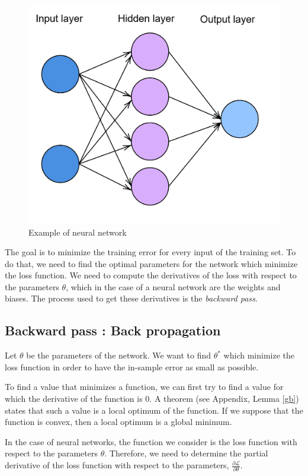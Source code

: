 \documentclass[10pt,a4paper]{article}
\theoremstyle{definition}
\theoremstyle{plain}
\begin{document}
\begin{figure}
\center
\includegraphics[scale=0.2]{nn.png}
\caption{Example of neural network}
\label{examplenn}
\end{figure}

The goal is to minimize the training error for every input of the training set. To do that, we need to find the optimal parameters for the network which minimize the loss function. We need to compute the derivatives of the loss with respect to the parameters $\theta$, which in the case of a neural network are the weights and biases. The process used to get these derivatives is the \textit{backward pass}.


\subsection{Backward pass : Back propagation}\label{ode}
Let $\theta$ be the parameters of the network. We want to find $\theta^*$ which minimize the loss function in order to have the in-sample error as small as possible.

To find a value that minimizes a function, we can first try to find a value for which the derivative of the function is $0$. A theorem (see Appendix, Lemma \ref{gb}) states that such a value is a local optimum of the function. If we suppose that the function is convex, then a local optimum is a global minimum.

In the case of neural networks, the function we consider is the loss function with respect to the parameters $\theta$.
Therefore, we need to determine the partial derivative of the loss function with respect to the parameters, $\frac{\partial \mathcal{L}}{\partial \theta}$.
\end{document}
